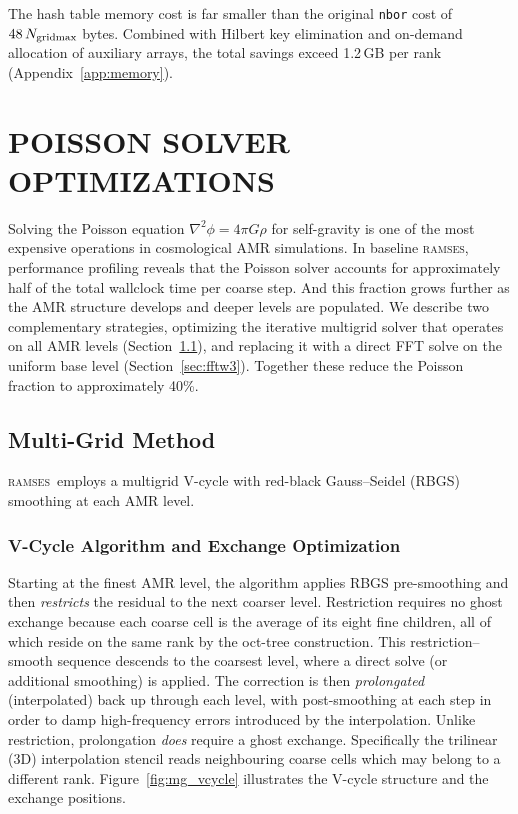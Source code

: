\documentclass[fleqn,usenatbib]{mnras}
\newcommand{\ramses}{\textsc{ramses}}
\newcommand{\ngridmax}{N_{\rm gridmax}}
\newcommand{\code}[1]{\texttt{#1}}
\begin{document}
The hash table memory cost is
far smaller than the original \code{nbor} cost of $48\,\ngridmax$ bytes.
Combined with Hilbert key elimination and on-demand allocation of
auxiliary arrays, the total savings exceed 1.2\,GB per rank
(Appendix~\ref{app:memory}).


\section{POISSON SOLVER OPTIMIZATIONS}
\label{sec:multigrid}

Solving the Poisson equation $\nabla^2\phi = 4\pi G\rho$ for
self-gravity is one of the most expensive operations in cosmological
AMR simulations.  In baseline \ramses, performance profiling reveals that the
Poisson solver accounts for approximately half of the total
wallclock time per coarse step. And this fraction grows further as the
AMR structure develops and deeper levels are populated.  We describe two complementary
strategies, optimizing the iterative multigrid solver that operates on
all AMR levels (Section~\ref{sec:mg_method}), and replacing it with a
direct FFT solve on the uniform base level
(Section~\ref{sec:fftw3}).  Together these reduce the Poisson
fraction to approximately 40\%.

\subsection{Multi-Grid Method}
\label{sec:mg_method}

\ramses\ employs a multigrid V-cycle
\citep{Brandt1977,Briggs2000,Trottenberg2001} with red-black
Gauss--Seidel (RBGS) smoothing \citep{Wesseling1992,Adams2001}
at each AMR level.

\subsubsection{V-Cycle Algorithm and Exchange Optimization}
\label{sec:mg_vcycle}

Starting at the finest AMR level, the algorithm applies RBGS
pre-smoothing and then \emph{restricts} the residual to the next
coarser level.  Restriction requires no ghost exchange because each
coarse cell is the average of its eight fine children, all of which
reside on the same rank by the oct-tree construction.  This
restriction--smooth sequence descends to the coarsest level, where a
direct solve (or additional smoothing) is applied.  The correction is
then \emph{prolongated} (interpolated) back up through each level,
with post-smoothing at each step in order to damp high-frequency errors
introduced by the interpolation.  Unlike restriction, prolongation
\emph{does} require a ghost exchange. Specifically the trilinear (3D) interpolation stencil reads neighbouring coarse cells which may belong to a different rank.  Figure~\ref{fig:mg_vcycle} illustrates the V-cycle structure and the exchange positions.
\end{document}

